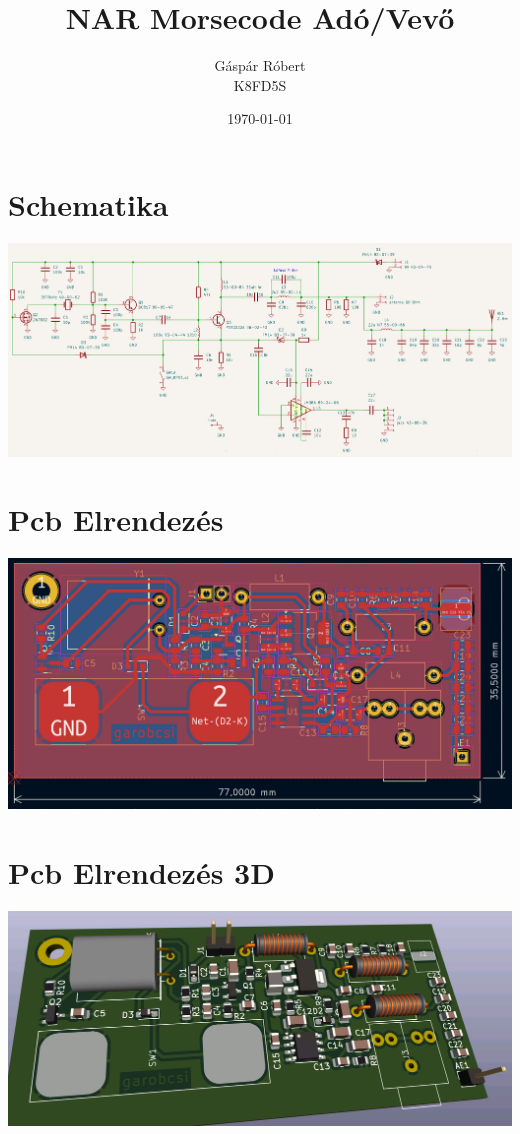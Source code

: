 \documentclass[11pt, letterpaper, openany, oneside]{article}
\title{\textbf{NAR Morsecode Adó/Vevő}}
\author{\LARGE Gáspár Róbert \vspace{4px} \\ K8FD5S}
\date{\today}
\begin{document}
\maketitle

\tableofcontents

\section{Schematika}

\includegraphics[width=\linewidth]{img/sch.png}

\section{Pcb Elrendezés}

\includegraphics[width=\linewidth]{img/pcb.png}

\section{Pcb Elrendezés 3D}

\includegraphics[width=\linewidth]{img/pcb 3d.png}
\end{document}
